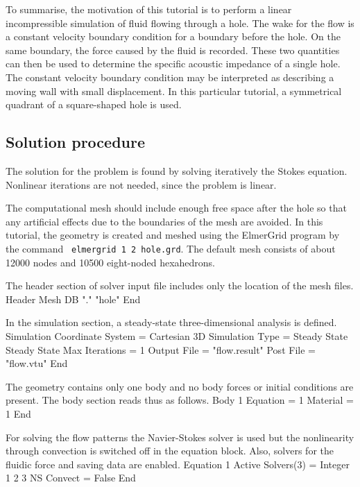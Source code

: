 To summarise, the motivation of this tutorial is to perform a linear
incompressible simulation of fluid flowing through a hole. The wake
for the flow is a constant velocity boundary condition for a boundary
before the hole. On the same boundary, the force caused by the fluid
is recorded. These two quantities can then be used to determine the
specific acoustic impedance of a single hole. The constant velocity
boundary condition may be interpreted as describing a moving wall with
small displacement. In this particular tutorial, a symmetrical
quadrant of a square-shaped hole is used.



\subsection*{Solution procedure}

The solution for the problem is found by solving iteratively the
Stokes equation. Nonlinear iterations are not needed, since the
problem is linear.

The computational mesh should include enough free space after the hole
so that any artificial effects due to the boundaries of the mesh are
avoided. In this tutorial, the geometry is created and meshed using
the ElmerGrid program by the command
{\tt
elmergrid 1 2 hole.grd}. 
The default mesh consists of about 12000 nodes and 10500 eight-noded
hexahedrons.

The header section of solver input file includes only the location of
the mesh files.
\ttbegin
Header
  Mesh DB "." "hole"
End
\ttend

In the simulation section, a steady-state three-dimensional analysis
is defined.
\ttbegin
Simulation
  Coordinate System = Cartesian 3D
  Simulation Type = Steady State
  Steady State Max Iterations = 1
  Output File = "flow.result"
  Post File = "flow.vtu"
End
\ttend

The geometry contains only one body and no body forces or initial
conditions are present. The body section reads thus as follows.
\ttbegin
Body 1
  Equation = 1
  Material = 1
End
\ttend

For solving the flow patterns the Navier-Stokes solver is used but the
nonlinearity through convection is switched off in the equation block.
Also, solvers for the fluidic force and saving data are enabled.
\ttbegin
Equation 1
  Active Solvers(3) = Integer 1 2 3
  NS Convect = False
End
\ttend


